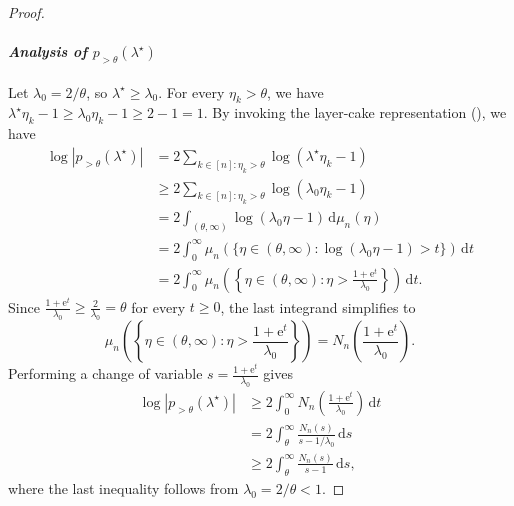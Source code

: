 \documentclass[11pt]{article}
\newcommand{\eu}{\mathrm{e}}
\newcommand{\du}{\mathrm{d}}
\newcommand{\abs}[1]{\left\lvert#1\right\rvert}
\begin{document}
\begin{proof}
\paragraph{\textbf{\textit{Analysis of $p_{>\theta}(\lambda^\star)$}}}
Let $\lambda_0=2/\theta$, so $\lambda^\star\geq\lambda_0$.
For every $\eta_k>\theta$, we have $\lambda^\star \eta_k - 1 \geq \lambda_0\eta_k -1\geq 2-1 = 1$.
By invoking the layer-cake representation (), we have
\begin{align*}
	\log \abs{ p_{>\theta}(\lambda^\star) }
	&= 2\sum_{k\in[n]:\eta_k>\theta} \log(\lambda^\star\eta_k-1) \\
	&\geq 2\sum_{k\in[n]:\eta_k>\theta} \log(\lambda_0\eta_k-1) \\
	&= 2\int_{(\theta,\infty)} \log ( \lambda_0\eta - 1 )\, \du\mu_n(\eta) \\
	&= 2\int_0^\infty \mu_n\left( \{ \eta\in(\theta,\infty): \log( \lambda_0\eta - 1 ) > t \} \right) \, \du t \\
	&= 2\int_0^\infty \mu_n\left( \left\{ \eta\in(\theta,\infty): \eta > \frac{1 + \eu^t}{\lambda_0} \right\} \right) \, \du t.
\end{align*}
Since $\frac{1 + \eu^t}{\lambda_0} \geq \frac{2}{\lambda_0} = \theta$ for every $t\geq 0$, the last integrand simplifies to
\[
	\mu_n\left( \left\{ \eta\in(\theta,\infty): \eta > \frac{1 + \eu^t}{\lambda_0} \right\} \right)
	= N_n\left( \frac{1 + \eu^t}{\lambda_0} \right).
\]
Performing a change of variable $s=\frac{1 + \eu^t}{\lambda_0}$ gives
\begin{equation}\label{eq:analysis_of_large_polynomial}
\begin{split}
	\log \abs{ p_{>\theta}(\lambda^\star) }
	&\geq 2\int_0^\infty N_n\left( \frac{1 + \eu^t}{\lambda_0} \right) \, \du t \\
	&= 2\int_{\theta}^\infty \frac{N_n(s)}{s-1/\lambda_0}\,\du s \\
	&\geq 2\int_{\theta}^\infty \frac{N_n(s)}{s-1}\,\du s,
\end{split}
\end{equation}
where the last inequality follows from $\lambda_0=2/\theta<1$.



\end{proof}
\end{document}

